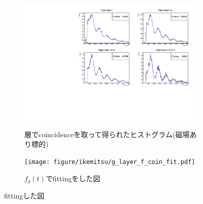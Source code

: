   \begin{figure}[H]
   \centering
   \begin{subfigure}{\columnwidth}
    \centering
    \includegraphics[height = 0.9\columnwidth , angle = -90]{figure/ikemitsu/g_layer_f_coin.pdf}
    \caption{層でcoincidenceを取って得られたヒストグラム(磁場あり標的)}
    \label{g_layercoin}
   \end{subfigure}
   \begin{subfigure}{\columnwidth}
    \centering
    \texttt{[image: figure/ikemitsu/g\_layer\_f\_coin\_fit.pdf]}
    \caption{$f_{g}(t)$でfittingをした図}
    \label{g_layercoin_fit}
   \end{subfigure}
   \caption{fittingした図}
   \label{g_layercoin_all}
  \end{figure}

  
